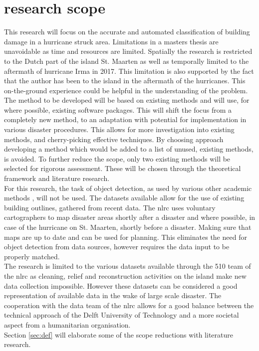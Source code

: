 \section{research scope}
This research will focus on the accurate and automated classification of building damage in a hurricane struck area. Limitations in a masters thesis are unavoidable as time and resources are limited. Spatially the research is restricted to the Dutch part of the island St. Maarten as well as temporally limited to the aftermath of hurricane Irma in 2017. This limitation is also supported by the fact that the author has been to the island in the aftermath of the hurricanes. This on-the-ground experience could be helpful in the understanding of the problem. \\
The method to be developed will be based on existing methods and will use, for where possible, existing software packages. This will shift the focus from a completely new method, to an adaptation with potential for implementation in various disaster procedures. This allows for more investigation into existing methods, and cherry-picking effective techniques. By choosing approach developing a method which would be added to a list of unused, existing methods, is avoided. To further reduce the scope, only two existing methods will be selected for rigorous assessment. These will be chosen through the theoretical framework and literature research. \\
For this research, the task of object detection, as used by various other academic methods \citep{Vetrivel2016b,Kakooei2017}, will not be used. The datasets available allow for the use of existing building outlines, gathered from recent data. The \ac{nlrc} uses voluntary cartographers to map disaster areas shortly after a disaster and where possible, in case of the hurricane on St. Maarten, shortly before a disaster. Making sure that maps are up to date and can be used for planning. This eliminates the need for object detection from data sources, however requires the data input to be properly matched.\\
The research is limited to the various datasets available through the 510 team of the \ac{nlrc} as cleaning, relief and reconstruction activities on the island make new data collection impossible. However these datasets can be considered a good representation of available data in the wake of large scale disaster. The cooperation with the data team of the \ac{nlrc} allows for a good balance between the technical approach of the Delft University of Technology and a more societal aspect from a humanitarian organisation.\\ 
Section \ref{sec:def} will elaborate some of the scope reductions with literature research.
